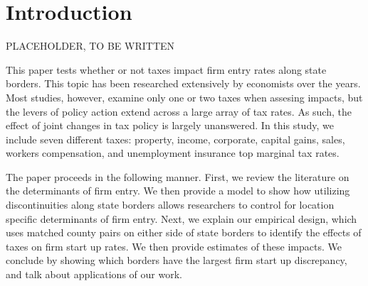 
\section{Introduction} 

PLACEHOLDER, TO BE WRITTEN

This paper tests whether or not taxes impact firm entry rates along state borders. This topic has been researched extensively by economists over the years. Most studies, however, examine only one or two taxes when assesing impacts, but the levers of policy action extend across a large array of tax rates. As such, the effect of joint changes in tax policy is largely unanswered. In this study,  we include seven different taxes: property, income, corporate, capital gains, sales, workers compensation, and unemployment insurance top marginal tax rates.

The paper proceeds in the following manner. First, we review the literature on the determinants of firm entry. We then provide a model to show how utilizing discontinuities along state borders allows researchers to control for location specific determinants of firm entry. Next, we explain our empirical design, which uses matched county pairs on either side of state borders to identify the effects of taxes on firm start up rates. We then provide estimates of these impacts. We conclude by showing which borders have the largest firm start up discrepancy, and talk about applications of our work.